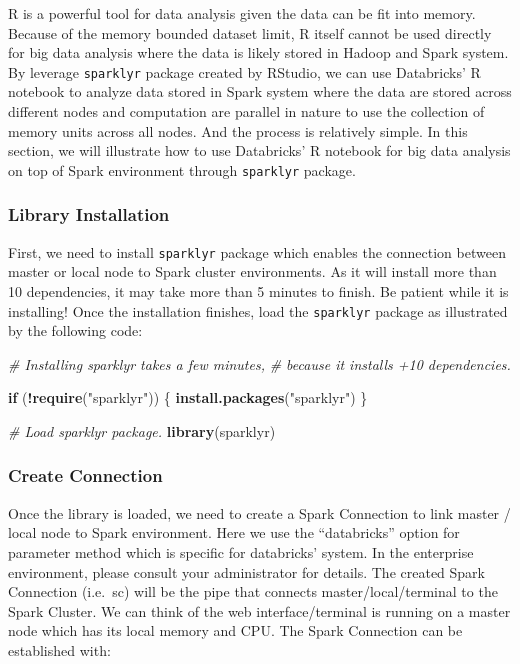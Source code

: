 \documentclass[
]{article}
\newenvironment{Shaded}{\begin{snugshade}}{\end{snugshade}}
\newcommand{\CommentTok}[1]{\textcolor[rgb]{0.56,0.35,0.01}{\textit{#1}}}
\newcommand{\ControlFlowTok}[1]{\textcolor[rgb]{0.13,0.29,0.53}{\textbf{#1}}}
\newcommand{\KeywordTok}[1]{\textcolor[rgb]{0.13,0.29,0.53}{\textbf{#1}}}
\newcommand{\NormalTok}[1]{#1}
\newcommand{\OperatorTok}[1]{\textcolor[rgb]{0.81,0.36,0.00}{\textbf{#1}}}
\newcommand{\StringTok}[1]{\textcolor[rgb]{0.31,0.60,0.02}{#1}}
\begin{document}
R is a powerful tool for data analysis given the data can be fit into
memory. Because of the memory bounded dataset limit, R itself cannot be
used directly for big data analysis where the data is likely stored in
Hadoop and Spark system. By leverage \texttt{sparklyr} package created
by RStudio, we can use Databricks' R notebook to analyze data stored in
Spark system where the data are stored across different nodes and
computation are parallel in nature to use the collection of memory units
across all nodes. And the process is relatively simple. In this section,
we will illustrate how to use Databricks' R notebook for big data
analysis on top of Spark environment through \texttt{sparklyr} package.

\hypertarget{library-installation}{%
\subsubsection{Library Installation}\label{library-installation}}

First, we need to install \texttt{sparklyr} package which enables the
connection between master or local node to Spark cluster environments.
As it will install more than 10 dependencies, it may take more than 5
minutes to finish. Be patient while it is installing! Once the
installation finishes, load the \texttt{sparklyr} package as illustrated
by the following code:

\begin{Shaded}
\begin{Highlighting}[]
\CommentTok{# Installing sparklyr takes a few minutes, }
\CommentTok{# because it installs +10 dependencies.}

\ControlFlowTok{if}\NormalTok{ (}\OperatorTok{!}\KeywordTok{require}\NormalTok{(}\StringTok{"sparklyr"}\NormalTok{)) \{}
  \KeywordTok{install.packages}\NormalTok{(}\StringTok{"sparklyr"}\NormalTok{)  }
\NormalTok{\}}

\CommentTok{# Load sparklyr package.}
\KeywordTok{library}\NormalTok{(sparklyr)}
\end{Highlighting}
\end{Shaded}

\hypertarget{create-connection}{%
\subsubsection{Create Connection}\label{create-connection}}

Once the library is loaded, we need to create a Spark Connection to link
master / local node to Spark environment. Here we use the ``databricks''
option for parameter method which is specific for databricks' system. In
the enterprise environment, please consult your administrator for
details. The created Spark Connection (i.e.~sc) will be the pipe that
connects master/local/terminal to the Spark Cluster. We can think of the
web interface/terminal is running on a master node which has its local
memory and CPU. The Spark Connection can be established with:
\end{document}

